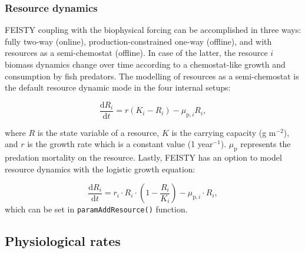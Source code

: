 \documentclass[
]{article}
\begin{document}
\hypertarget{resource-dynamics}{%
\subsubsection{Resource dynamics}\label{resource-dynamics}}

FEISTY coupling with the biophysical forcing can be accomplished in
three ways: fully two-way (online), production-constrained one-way
(offline), and with resources as a semi-chemostat (offline). In case of
the latter, the resource \(i\) biomass dynamics change over time
according to a chemostat-like growth and consumption by fish predators.
The modelling of resources as a semi-chemostat is the default resource
dynamic mode in the four internal setups:

\begin{equation}
\dfrac{\mathrm{d}R_{i}}{\mathrm{d}t} =  r(K_i - R_i ) - \mu_{\mathrm{p},i} R_i,
\end{equation}

where \(R\) is the state variable of a resource, \(K\) is the carrying
capacity (g m\(^{-2}\)), and \(r\) is the growth rate which is a
constant value (1 year\(^{-1}\)). \(\mu_{\mathrm{p}}\) represents the
predation mortality on the resource. Lastly, FEISTY has an option to
model resource dynamics with the logistic growth equation:

\begin{equation}
\frac{\mathrm{d}R_i}{\mathrm{d}t}=r_i \cdot R_i \cdot (1-\frac{R_i}{K_i}) - \mu_{\mathrm{p},i} \cdot R_i,
\end{equation} which can be set in \texttt{paramAddResource()} function.

\hypertarget{physiological-rates}{%
\subsection{Physiological rates}\label{physiological-rates}}
\end{document}
